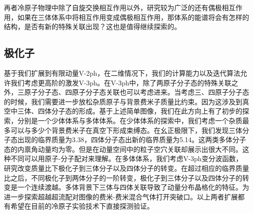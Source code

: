再者冷原子物理中除了自旋交换相互作用以外，研究较为广泛的还有偶极相互作用，如果在三体体系中将相互作用变成偶极相互作用，那体系的能谱将会有怎样的结构，是否有新的特殊关联出现？这也是值得继续探索的。

\subsection{极化子}
基于我们扩展到有限动量V-2ph，在二维情况下，我们的计算能力以及迭代算法允许我们考虑更高阶的激发V-3ph。在V-3ph中，除了两原子分子态的特殊关联之外，三原子分子态、四原子分子态关联也可以考虑进来。当考虑三、四原子分子态的时候，我们需要进一步放松杂质原子与背景费米子质量比约束。因为这涉及到真空中三体、四体分子态的形成。基于上述简单图像，我们在此方向上有了初步的探索，分别是一个少体体系与多体体系。在少体体系的探索中，我们考虑一个杂质最多可以与多少个背景费米子在真空下形成束缚态。在幺正极限下，我们发现三体分子态出现的临界质量为3.38，四体分子态出新的临界质量为5.14。这两类多体分子态的内禀角动量均为零。但是在动量空间中的粒子空穴关联却展示出很大不同。这种不同可以用原子-分子配对来理解。在多体体系，我们考虑V-3ph变分波函数，研究改变质量比下极化子到三体分子以及四体分子的转变。在超过相应的临界质量比之后，不同极化子到两体分子的一阶转变，极化子到三体分子以及四体分子的转变是一个连续渡越。多体背景下三体与四体关联导致了动量分布晶格化的特征。为进一步探索超越超流配对图像的费米-费米混合气体打开突破口。以上两者扩展都有希望在目前的冷原子实验技术下直接探测验证。


